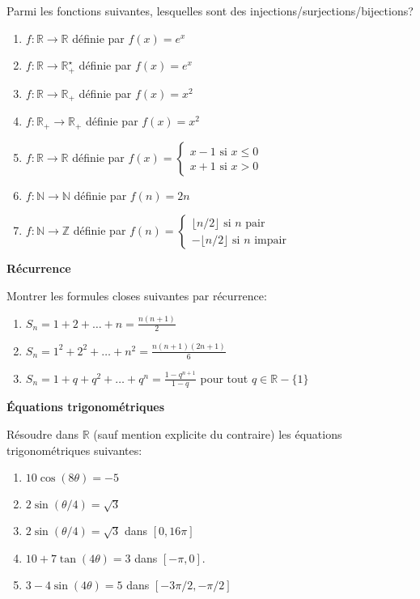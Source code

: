 \documentclass[a4paper,12pt]{article}
\begin{document}
Parmi les fonctions suivantes, lesquelles sont des injections/surjections/bijections?
\begin{enumerate}
\item $f: \mathbb{R} \to \mathbb{R}$ définie par $f(x) = e^x$
\item $f: \mathbb{R} \to \mathbb{R}_+^\star$ définie par $f(x) = e^x$
\item $f: \mathbb{R} \to \mathbb{R}_+$ définie par $f(x) = x^2$
\item $f: \mathbb{R}_+ \to \mathbb{R}_+$ définie par $f(x) = x^2$
\item $f: \mathbb{R} \to \mathbb{R}$ définie par $f(x) = \begin{cases} x-1 \text{ si } x \leq 0 \\ x+1 \text{ si } x > 0 \end{cases}$
\item $f: \mathbb{N} \to \mathbb{N}$ définie par $f(n) = 2n$
\item $f: \mathbb{N} \to \mathbb{Z}$ définie par $f(n) = \begin{cases} \lfloor n/2 \rfloor \text{ si } n \text{ pair} \\ - \lfloor n/2 \rfloor \text{ si } n \text{ impair} \end{cases}$
\end{enumerate}


\Exo \textbf{Récurrence}

Montrer les formules closes suivantes par récurrence:
\begin{enumerate}
\item $S_n = 1 + 2 + \dots + n = \frac{n(n+1)}{2}$
\item $S_n = 1^2 + 2^2 + \dots + n^2 = \frac{n(n+1)(2n+1)}{6}$
\item $S_n = 1 + q + q^2 + \dots + q^n = \frac{1-q^{n+1}}{1-q}$ pour tout $q \in \mathbb{R}-\{1\}$
\end{enumerate}

\Exo \textbf{\'Equations trigonométriques}

Résoudre dans $\mathbb{R}$ (sauf mention explicite du contraire) les équations trigonométriques suivantes:
\begin{enumerate}
\item $10\cos(8\theta) = -5$
\item $2\sin(\theta/4) = \sqrt{3}$
\item $2\sin(\theta/4) = \sqrt{3}$ dans $[0, 16\pi]$
\item $10 + 7\tan(4\theta) = 3$ dans $[-\pi, 0]$. 
\item $3 - 4\sin(4\theta) = 5$ dans $[-3\pi/2, -\pi/2]$
\end{enumerate}
\end{document}
